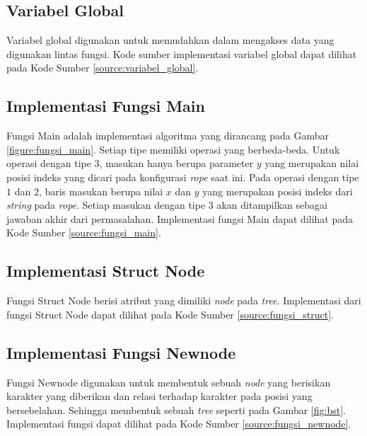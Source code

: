 \subsection{Variabel Global}
Variabel global digunakan untuk memudahkan dalam mengakses data yang digunakan lintas fungsi. Kode sumber implementasi variabel global dapat dilihat pada Kode Sumber \ref{source:variabel_global}.

\begin{minipage}{\linewidth}

\end{minipage}
	
\subsection{Implementasi Fungsi Main}
Fungsi Main adalah implementasi algoritma yang dirancang pada Gambar \ref{figure:fungsi_main}. Setiap tipe memiliki operasi yang berbeda-beda. Untuk operasi dengan tipe $3$, masukan hanya berupa parameter $y$ yang merupakan nilai posisi indeks yang dicari pada konfigurasi \textit{rope} saat ini. Pada operasi dengan tipe $1$ dan $2$, baris masukan berupa nilai $x$ dan $y$ yang merupakan posisi indeks dari \textit{string} pada \textit{rope}. Setiap masukan dengan tipe $3$ akan ditampilkan sebagai jawaban akhir dari permasalahan. Implementasi fungsi Main dapat dilihat pada Kode Sumber \ref{source:fungsi_main}.



\subsection{Implementasi Struct Node}
Fungsi Struct Node berisi atribut yang dimiliki \textit{node} pada \textit{tree}. Implementasi dari fungsi Struct Node dapat dilihat pada Kode Sumber \ref{source:fungsi_struct}.



\subsection{Implementasi Fungsi Newnode}
Fungsi Newnode digunakan untuk membentuk sebuah \textit{node} yang berisikan karakter yang diberikan dan relasi terhadap karakter pada posisi yang bersebelahan. Sehingga membentuk sebuah \textit{tree} seperti pada Gambar \ref{fig:bst}. Implementasi fungsi  dapat dilihat pada Kode Sumber \ref{source:fungsi_newnode}.

